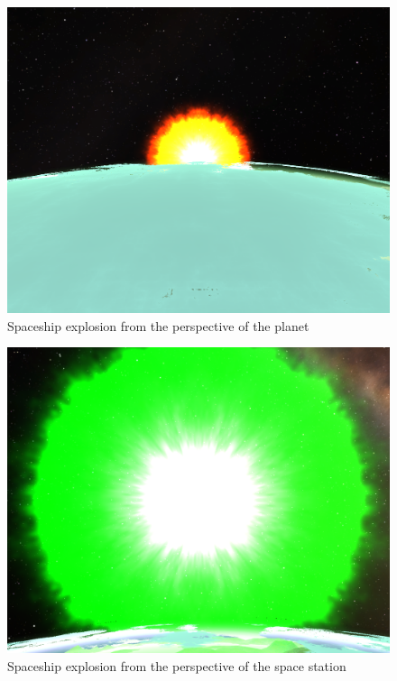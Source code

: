 \documentclass[reprint,english,notitlepage]{revtex4-2}
\begin{document}
  \begin{figure}[h!]
    \centering
    \includegraphics[scale = .125]{figures/Explo_Planet.png}
    \caption{Spaceship explosion from the perspective of the planet }
    \label{fig: Explo Planet}
  \end{figure}
  
  \begin{figure}[h!]
    \centering
    \includegraphics[scale = .125]{figures/Explo_Space.png}
    \caption{Spaceship explosion from the perspective of the space station }
    \label{fig: Explo Space}
  \end{figure}
\end{document}
